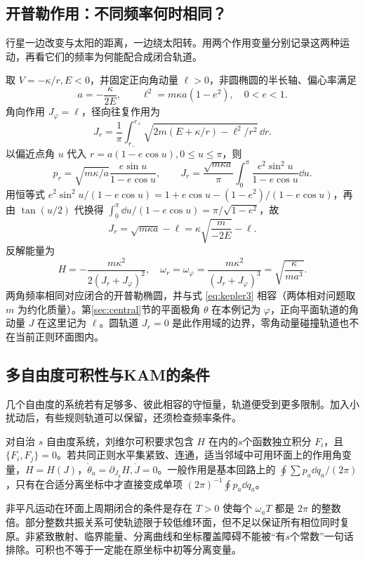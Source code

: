 \subsection{开普勒作用：不同频率何时相同？}\label{sec:kepler-action}
行星一边改变与太阳的距离，一边绕太阳转。用两个作用变量分别记录这两种运动，再看它们的频率为何能配合成闭合轨道。

\begin{example}[有界平面库仑势的径向作用]
取 $V=-\kappa/r,E<0$，并固定正向角动量 $\ell>0$，非圆椭圆的半长轴、偏心率满足
\[
a=-\frac\kappa{2E},\qquad \ell^2=m\kappa a(1-e^2),\quad0<e<1.
\]
角向作用 $J_\varphi=\ell$，径向往复作用为
\[
J_r=\frac1\pi\int_{r_-}^{r_+}\sqrt{2m(E+\kappa/r)-\ell^2/r^2}\,\dd r.
\]
以偏近点角 $u$ 代入 $r=a(1-e\cos u),0\le u\le\pi$，则
\[
p_r=\sqrt{m\kappa/a}\frac{e\sin u}{1-e\cos u},\qquad
J_r=\frac{\sqrt{m\kappa a}}\pi\int_0^\pi
\frac{e^2\sin^2u}{1-e\cos u}\dd u.
\]
用恒等式 $e^2\sin^2u/(1-e\cos u)=1+e\cos u-(1-e^2)/(1-e\cos u)$，再由 $\tan(u/2)$ 代换得 $\int_0^\pi\dd u/(1-e\cos u)=\pi/\sqrt{1-e^2}$，故
\[
J_r=\sqrt{m\kappa a}-\ell
=\kappa\sqrt{\frac{m}{-2E}}-\ell.
\]
反解能量为
\[
H=-\frac{m\kappa^2}{2(J_r+J_\varphi)^2},\quad
\omega_r=\omega_\varphi=\frac{m\kappa^2}{(J_r+J_\varphi)^3}
=\sqrt{\frac\kappa{ma^3}}.
\]
两角频率相同对应闭合的开普勒椭圆，并与式 \eqref{eq:kepler3} 相容（两体相对问题取 $m$ 为约化质量）。第\ref{sec:central}节的平面极角 $\theta$ 在本例记为 $\varphi$，正向平面轨道的角动量 $J$ 在这里记为 $\ell$。圆轨道 $J_r=0$ 是此作用域的边界，零角动量碰撞轨道也不在当前正则环面图内。
\end{example}

\subsection{多自由度可积性与KAM的条件}
几个自由度的系统若有足够多、彼此相容的守恒量，轨道便受到更多限制。加入小扰动后，有些规则轨道可以保留，还须检查频率条件。

对自治 $s$ 自由度系统，刘维尔可积要求包含 $H$ 在内的$s$个函数独立积分 $F_i$，且 $\{F_i,F_j\}=0$。若共同正则水平集紧致、连通，适当邻域中可用环面上的作用角变量，$H=H(J)$，$\dot\theta_a=\partial_{J_a}H,\dot J=0$。一般作用是基本回路上的 $\oint\sum p_a\dd q_a/(2\pi)$，只有在合适分离坐标中才直接变成单项 $(2\pi)^{-1}\oint p_a\dd q_a$。

非平凡运动在环面上周期闭合的条件是存在 $T>0$ 使每个 $\omega_aT$ 都是 $2\pi$ 的整数倍。部分整数共振关系可使轨迹限于较低维环面，但不足以保证所有相位同时复原。非紧致散射、临界能量、分离曲线和坐标覆盖障碍不能被“有$s$个常数”一句话排除。可积也不等于一定能在原坐标中初等分离变量。

